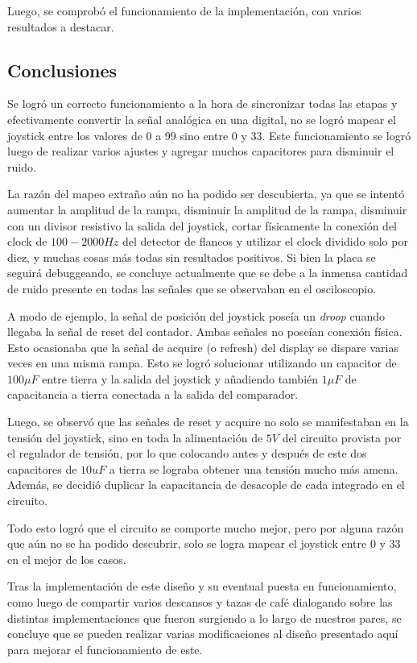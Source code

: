 Luego, se comprobó el funcionamiento de la implementación, con varios resultados a destacar.

\subsection{Conclusiones}

Se logró un correcto funcionamiento a la hora de sincronizar todas las etapas y efectivamente convertir la señal analógica en una digital, no se logró mapear el joystick entre los valores de 0 a 99 sino entre 0 y 33. Este funcionamiento se logró luego de realizar varios ajustes y agregar muchos capacitores para disminuir el ruido.

La razón del mapeo extraño aún no ha podido ser descubierta, ya que se intentó aumentar la amplitud de la rampa, disminuir la amplitud de la rampa, disminuir con un divisor resistivo la salida del joystick, cortar físicamente la conexión del clock de $100-2000Hz$ del detector de flancos y utilizar el clock dividido solo por diez, y muchas cosas más todas sin resultados positivos. Si bien la placa se seguirá debuggeando, se concluye actualmente que se debe a la inmensa cantidad de ruido presente en todas las señales que se observaban en el osciloscopio.

A modo de ejemplo, la señal de posición del joystick poseía un \textit{droop} cuando llegaba la señal de reset del contador. Ambas señales no poseían conexión física. Esto ocasionaba que la señal de acquire (o refresh) del display se dispare varias veces en una misma rampa. Esto se logró solucionar utilizando un capacitor de $100\mu F$ entre tierra y la salida del joystick y añadiendo también $1\mu F$ de capacitancia a tierra conectada a la salida del comparador.

Luego, se observó que las señales de reset y acquire no solo se manifestaban en la tensión del joystick, sino en toda la alimentación de $5V$ del circuito provista por el regulador de tensión, por lo que colocando antes y después de este dos capacitores de $10uF$ a tierra se lograba obtener una tensión mucho más amena. Además, se decidió duplicar la capacitancia de desacople de cada integrado en el circuito.

Todo esto logró que el circuito se comporte mucho mejor, pero por alguna razón que aún no se ha podido descubrir, solo se logra mapear el joystick entre 0 y 33 en el mejor de los casos. 

Tras la implementación de este diseño y su eventual puesta en funcionamiento, como luego de compartir varios descansos y tazas de café dialogando sobre las distintas implementaciones que fueron surgiendo a lo largo de nuestros pares, se concluye que se pueden realizar varias modificaciones al diseño presentado aquí para mejorar el funcionamiento de este.

